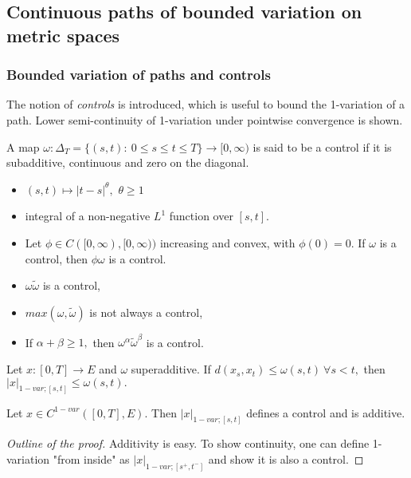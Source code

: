 \subsection{Continuous paths of bounded variation on
metric spaces}

\subsubsection{Bounded variation of paths and controls}

The notion of \textit{controls} is introduced, which is useful to bound the 1-variation of a path. Lower semi-continuity of 1-variation under pointwise convergence is shown.

\begin{definition}
    A map $\omega: \Delta_T = \{(s,t):\ 0 \leq s \leq t \leq T \} \rightarrow [0, \infty)$
    is said to be a control if it is subadditive, continuous and zero on the diagonal. 
\end{definition}

\begin{example}
    \begin{itemize}
        \item $(s,t) \mapsto |t - s|^{\theta},$ $\theta \geq 1$
        \item integral of a non-negative $L^1$ function over $[s,t].$
        \item Let $\phi \in C([0,\infty), [0,\infty))$ increasing and convex, with $\phi(0)=0.$ If $\omega$ is a control, then $\phi \omega$ is a control.
        \item $\omega \tilde{\omega}$ is a control,
        \item $max(\omega, \tilde{\omega})$ is not always a control,
        \item If $\alpha + \beta \geq 1,$ then $\omega^{\alpha} \tilde{\omega}^{\beta}$ is a control.
    \end{itemize}
\end{example}

\begin{proposition}
    Let $x:[0,T] \rightarrow E$ and $\omega$ superadditive. If $d(x_s, x_t) \leq \omega(s, t)\ \forall s < t,$ then $|x|_{1-var; [s,t]} \leq \omega(s,t).$
\end{proposition}

\begin{proposition}\label{theo:1varcontrol}
    Let $x \in C^{1-var}([0,T],E).$ Then $|x|_{1-var; [s,t]}$ defines a control and is additive.    
\end{proposition}
\begin{proof}[Outline of the proof]
    Additivity is easy.
    To show continuity, one can define 1-variation "from inside" as $|x|_{1-var; [s^+,t^-]}$ and show it is also a control.
\end{proof}

